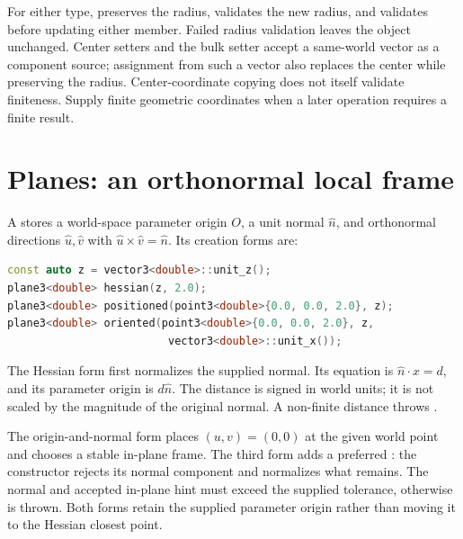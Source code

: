 For either type,  preserves the radius,
 validates the new radius, and
 validates before updating either member. Failed
radius validation leaves the object unchanged. Center setters and the bulk
setter accept a same-world vector as a component source; assignment from
such a vector also replaces the center while preserving the radius.
Center-coordinate copying does not itself validate finiteness. Supply finite
geometric coordinates when a later operation requires a finite result.

\section{Planes: an orthonormal local frame}

A  stores a world-space parameter origin $O$, a unit normal
$\widehat n$, and orthonormal directions $\widehat u,\widehat v$ with
$\widehat u\times\widehat v=\widehat n$. Its creation forms are:

\begin{lstlisting}[language=C++]
const auto z = vector3<double>::unit_z();
plane3<double> hessian(z, 2.0);
plane3<double> positioned(point3<double>{0.0, 0.0, 2.0}, z);
plane3<double> oriented(point3<double>{0.0, 0.0, 2.0}, z,
                         vector3<double>::unit_x());
\end{lstlisting}

The Hessian form  first
normalizes the supplied normal. Its equation is
$\widehat n\cdot x=d$, and its parameter origin is $d\widehat n$.
The distance is signed in world units; it is not scaled by the magnitude of
the original normal. A non-finite distance throws
.

The origin-and-normal form places $(u,v)=(0,0)$ at the given world point and
chooses a stable in-plane frame. The third form adds a preferred
: the constructor rejects its normal component and normalizes
what remains. The normal and accepted in-plane hint must exceed the supplied
tolerance, otherwise  is thrown. Both forms retain
the supplied parameter origin rather than moving it to the Hessian closest
point.

